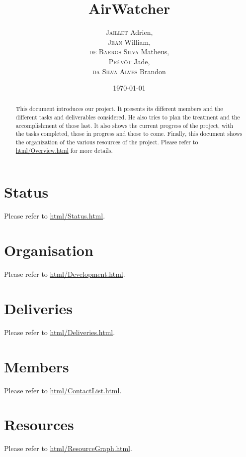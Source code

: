 \documentclass{article}
\title{AirWatcher}
\author{\textsc{Jaillet} Adrien,\\
		\textsc{Jean} William,\\
		\textsc{de Barros Silva} Matheus,\\
		\textsc{Prévôt} Jade,\\
		\textsc{da Silva Alves} Brandon}
\date{\today}
\begin{document}
	\maketitle
	\begin{abstract}
		This document introduces our project. It presents its different members
		and the different tasks and deliverables considered. He also tries to
		plan the treatment and the accomplishment of those last. It also shows
		the current progress of the project, with the tasks completed, those in
		progress and those to come. Finally, this document shows the organization
		of the various resources of the project. Please refer to
		\url{html/Overview.html} for more details.
	\end{abstract}
	\section*{Status}
		Please refer to \url{html/Status.html}.
	\section*{Organisation}
		Please refer to \url{html/Development.html}.
	\section*{Deliveries}
		Please refer to \url{html/Deliveries.html}.
	\section*{Members}
		Please refer to \url{html/ContactList.html}.
	\section*{Resources}
		Please refer to \url{html/ResourceGraph.html}.
\end{document}
